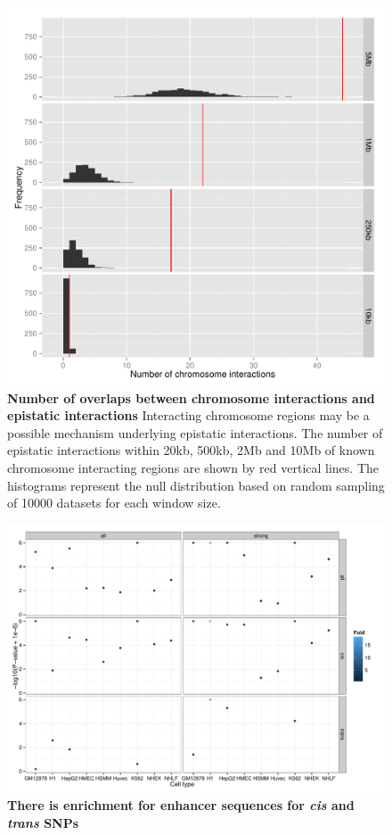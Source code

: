 \documentclass{article}
\begin{document}
\begin{figure}
	\centering
	\includegraphics[width=5in]{chromosome_interactions}
	\caption{\textbf{Number of overlaps between chromosome interactions and epistatic interactions} Interacting chromosome regions may be a possible mechanism underlying epistatic interactions. The number of epistatic interactions within 20kb, 500kb, 2Mb and 10Mb of known chromosome interacting regions are shown by red vertical lines. The histograms represent the null distribution based on random sampling of 10000 datasets for each window size.}
	\label{fig:chromosomeinteractions}
\end{figure}
\clearpage

\begin{figure}
	\centering
	\includegraphics[width=5in]{enhancers}
	\caption{\textbf{There is enrichment for enhancer sequences for \emph{cis} and \emph{trans} SNPs}}
	\label{fig:enhancers}
\end{figure}
\end{document}
